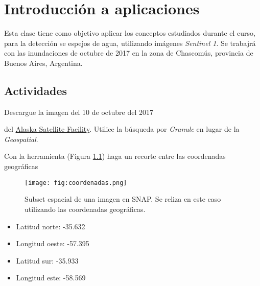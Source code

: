 \chapter{Introducción a aplicaciones}

Esta clase tiene como objetivo aplicar los conceptos estudiados durante el curso, para la detección se espejos de agua, utilizando imágenes \emph{Sentinel 1}. Se trabajrá con las inundaciones de octubre de 2017 en la zona de Chascomús, provincia de Buenos Aires, Argentina.



\section{Actividades}

\begin{que}
    Descargue la imagen del 10 de octubre del 2017
    \begin{center}\end{center} del \href{https://vertex.daac.asf.alaska.edu/}{Alaska Satellite Facility}. Utilice la búsqueda por \emph{Granule} en lugar de la \emph{Geospatial}.
\end{que}

\begin{que}
    Con la herramienta  (Figura \ref{fig:coordenadas}) haga un recorte entre las coordenadas geográficas
    \begin{figure}[h!]
        \centering
        \texttt{[image: fig:coordenadas.png]}
        \caption{Subset espacial de una imagen en SNAP. Se reliza en este caso utilizando las coordenadas geográficas.}
        \label{fig:coordenadas}
    \end{figure}
    \begin{itemize}
        \item Latitud norte: -35.632
        \item Longitud oeste: -57.395
        \item Latitud sur: -35.933
        \item Longitud este: -58.569
    \end{itemize}


\end{que}

